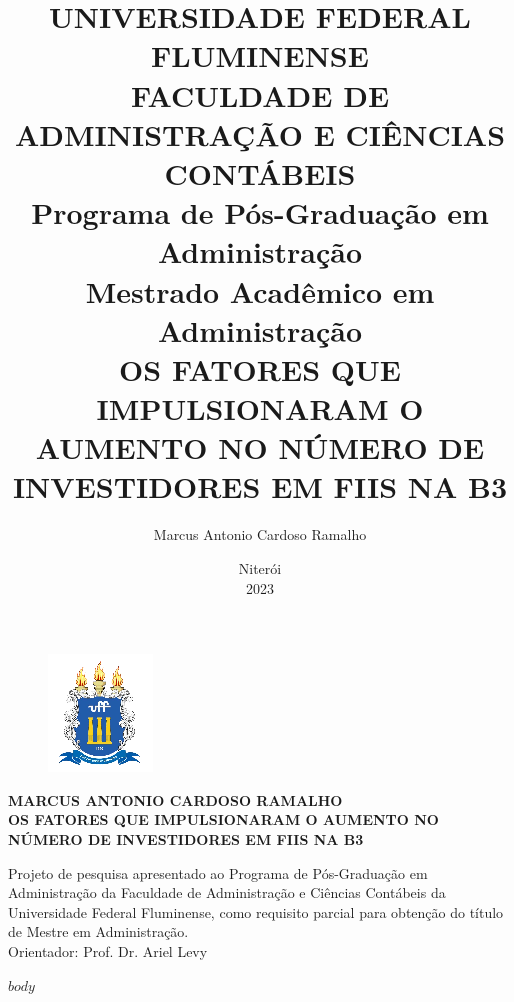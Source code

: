 \documentclass[a4paper,12pt]{article}
\title{\textbf{\fontsize{12}{14}\selectfont 
UNIVERSIDADE FEDERAL FLUMINENSE\\[0.2cm]
FACULDADE DE ADMINISTRAÇÃO E CIÊNCIAS CONTÁBEIS\\[0.2cm]
Programa de Pós-Graduação em Administração\\[0.2cm]
Mestrado Acadêmico em Administração\\[4.5cm]
OS FATORES QUE IMPULSIONARAM O AUMENTO NO NÚMERO DE INVESTIDORES EM FIIS NA B3\\[4cm]
}}
\author{Marcus Antonio Cardoso Ramalho}
\date{\vspace{4cm}Niterói\\[0.2cm]2023}
\begin{document}
\begin{figure}
\centering
\includegraphics{UFF.png}\\[-1.5cm]
\end{figure}
\maketitle



\begin{center}
\textbf{MARCUS ANTONIO CARDOSO RAMALHO\\[2cm]
OS FATORES QUE IMPULSIONARAM O AUMENTO NO NÚMERO DE INVESTIDORES EM FIIS NA B3\\[7cm]}
\end{center}

\justify
\begin{adjustwidth}{.7\textwidth}{}

Projeto de pesquisa apresentado ao Programa de Pós-Graduação em Administração da Faculdade de Administração e Ciências Contábeis da Universidade Federal Fluminense, como requisito parcial para obtenção do título de Mestre em Administração.\\[2cm]
Orientador: Prof. Dr. Ariel Levy
\end{adjustwidth}

$body$
\end{document}
